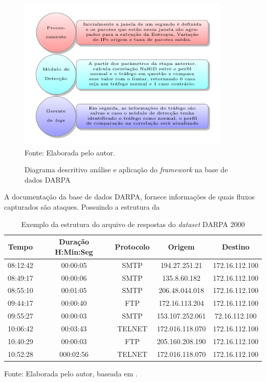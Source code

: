 \begin{figure}[!ht]
 	\centering
 	\caption{Diagrama descritivo análise e aplicação do \textit{framework} na base de dados DARPA  }
 	\includegraphics[width=0.9\textwidth]{figs/analiseDarpa.pdf}\\
 	{Fonte: Elaborada pelo autor.}
 	\label{fig:analiseDarpa}
\end{figure}

A documentação da base de dados DARPA, fornece informações de quais fluxos capturados são ataques. Possuindo a estrutura da  
 \begin{table}[!htb]
 	\centering
 	\begin{threeparttable}
 		\caption{Exemplo da estrutura do  arquivo de respostas do \textit{dataset} DARPA 2000}
 		\label{Tab:RespostasDarpa}
 		\begin{tabular}{c c c c c }
 			\toprule
 			 \textbf{Tempo} &  \textbf{Duração H:Min:Seg} & \textbf{Protocolo} & \textbf{Origem} & \textbf{Destino}
 			\\ \midrule
 			  08:12:42 & 00:00:05 & SMTP& 194.27.251.21 & 172.16.112.100    \\ \midrule
			 08:49:17 & 00:00:06 & SMTP&  135.8.60.182 & 172.16.112.100    \\ \midrule
			 08:55:10 & 00:01:05 & SMTP&  206.48.044.018 & 172.16.112.100    \\ \midrule
			 09:44:17 & 00:00:40 & FTP&  172.16.113.204 & 172.16.112.100    \\ \midrule
			 09:55:27 & 00:00:03 & SMTP&  153.107.252.061 & 72.16.112.100    \\ \midrule
			 10:06:42 & 00:03:43 & TELNET&  172.016.118.070 & 172.16.112.100    \\ \midrule
			 10:40:29 & 00:00:03 & FTP&  205.160.208.190 & 172.16.112.100    \\ \midrule
 			 10:52:28 & 000:02:56 & TELNET& 172.016.118.070 & 172.16.112.100  \\ \bottomrule
 		\end{tabular}
 		{Fonte: Elaborada pelo autor, baseada em \cite{DARPA}.}
 	\end{threeparttable}
 \end{table}
 
